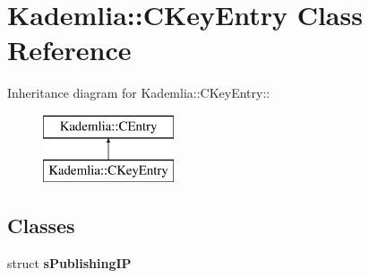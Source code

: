 \section{Kademlia::CKeyEntry Class Reference}
\label{classKademlia_1_1CKeyEntry}
Inheritance diagram for Kademlia::CKeyEntry::\begin{figure}[H]
\begin{center}
\leavevmode
\includegraphics[height=2cm]{classKademlia_1_1CKeyEntry}
\end{center}
\end{figure}
\subsection*{Classes}
\begin{DoxyCompactItemize}
\item 
struct {\bf sPublishingIP}
\end{DoxyCompactItemize}
